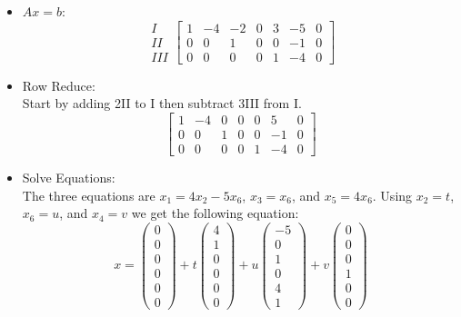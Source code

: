 \documentclass[12pt,a4paper]{exam}
\begin{document}
\begin{enumerate}
\begin{solution}
\begin{itemize}
            
        \item $Ax=b$:\\
            \[ \begin{matrix}
                I\\II\\III
            \end{matrix} \left[ \begin{array}{ccccccc}
            1 & -4 & -2 & 0 & 3 & -5 & 0\\
            0 & 0 & 1 & 0 & 0 & -1 & 0\\ 
            0 & 0 & 0 & 0 & 1 & -4 & 0
            \end{array} \right] \]
        \item Row Reduce:\\
            Start by adding 2II to I then subtract 3III from I.
            \[ \left[ \begin{array}{ccccccc}
            1 & -4 & 0 & 0 & 0 & 5 & 0\\
            0 & 0 & 1 & 0 & 0 & -1 & 0\\ 
            0 & 0 & 0 & 0 & 1 & -4 & 0
            \end{array} \right] \]
        \item Solve Equations:\\
            The three equations are $x_1=4x_2-5x_6$, $x_3=x_6$, and $x_5=4x_6$. Using $x_2=t$, $x_6=u$, and $x_4=v$ we get the following equation:
            $$x=\left(\begin{matrix}
                0\\0\\0\\0\\0\\0
            \end{matrix} \right) + 
            t\left(\begin{matrix}
                4\\1\\0\\0\\0\\0
            \end{matrix} \right) + 
            u\left(\begin{matrix}
                -5\\0\\1\\0\\4\\1
            \end{matrix} \right) + 
            v\left(\begin{matrix}
                0\\0\\0\\1\\0\\0
            \end{matrix} \right)$$


\end{itemize}
\end{solution}
\end{enumerate}
\end{document}
